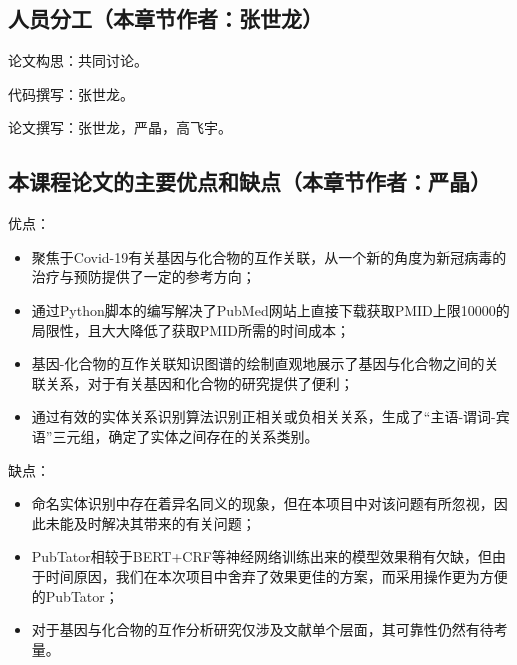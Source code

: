 \documentclass[twocolumn]{article}
\begin{document}
\subsection{人员分工（本章节作者：张世龙）}
论文构思：共同讨论。\par
代码撰写：张世龙。\par
论文撰写：张世龙，严晶，高飞宇。\par

\subsection{本课程论文的主要优点和缺点（本章节作者：严晶）}
优点：\par
\begin{itemize}
	\item 聚焦于Covid-19有关基因与化合物的互作关联，从一个新的角度为新冠病毒的治疗与预防提供了一定的参考方向；
	\item 通过Python脚本的编写解决了PubMed网站上直接下载获取PMID上限10000的局限性，且大大降低了获取PMID所需的时间成本；
	\item 基因-化合物的互作关联知识图谱的绘制直观地展示了基因与化合物之间的关联关系，对于有关基因和化合物的研究提供了便利；
	\item 通过有效的实体关系识别算法识别正相关或负相关关系，生成了“主语-谓词-宾语”三元组，确定了实体之间存在的关系类别。
\end{itemize}\par
缺点：\par
\begin{itemize}
	\item 命名实体识别中存在着异名同义的现象，但在本项目中对该问题有所忽视，因此未能及时解决其带来的有关问题；
	\item PubTator相较于BERT+CRF等神经网络训练出来的模型效果稍有欠缺，但由于时间原因，我们在本次项目中舍弃了效果更佳的方案，而采用操作更为方便的PubTator；
	\item 对于基因与化合物的互作分析研究仅涉及文献单个层面，其可靠性仍然有待考量。
\end{itemize}\par
\end{document}
